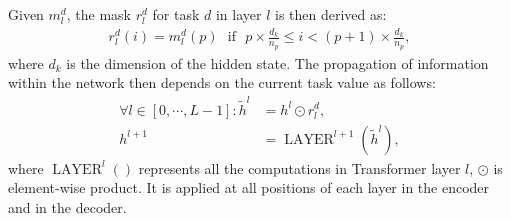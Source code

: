 \documentclass[11pt]{article}
\newcommand{\fyDone}[1]{\done[FY]\Todo[FY:]{\textcolor{orange}{#1}}}
\begin{document}
Given $m_l^d$, the mask $r_l^d$ for task $d$ in layer $l$ is then derived as:
\begin{align*}
  r_l^d(i) = m_l^d(p) \ \ \ \text{if}\ \ \ p \times \frac{d_k}{n_p} \leqslant i < (p+1) \times \frac{d_k}{n_p},
\end{align*}
where $d_k$ is the dimension of the hidden state.\fyDone{Check this} The propagation of information within the network then depends on the current task value as follows:
\begin{align*}
  \forall l \in [0,\cdots, L-1]: \tilde{h}^l &= h^l \odot r_l^d ,\\
  h^{l+1} &= \operatorname{LAYER}^{l+1}(\tilde{h}^l) ,
\end{align*}
where $\operatorname{LAYER}^l()$ represents all the computations in Transformer layer $l$, $\odot$ is element-wise product. It is applied at all positions of each layer in the encoder and in the decoder.  
\end{document}
